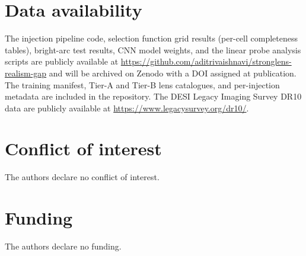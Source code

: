 \documentclass[fleqn,usenatbib]{rasti}
\begin{document}
\section*{Data availability}
The injection pipeline code, selection function grid results (per-cell completeness tables), bright-arc test results, CNN model weights, and the linear probe analysis scripts are publicly available at \url{https://github.com/aditrivaishnavi/stronglens-realism-gap} and will be archived on Zenodo with a DOI assigned at publication.  The training manifest, Tier-A and Tier-B lens catalogues, and per-injection metadata are included in the repository.  The DESI Legacy Imaging Survey DR10 data are publicly available at \url{https://www.legacysurvey.org/dr10/}.


\section*{Conflict of interest}
The authors declare no conflict of interest.


\section*{Funding}
The authors declare no funding.
\end{document}
